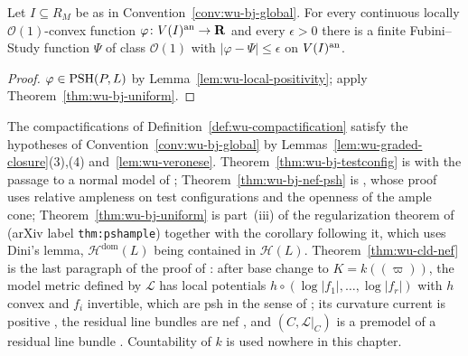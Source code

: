 \begin{theorem}\label{thm:wu-pos}
\leanok
{}
Let $I\subseteq R_M$ be as in Convention~\ref{conv:wu-bj-global}. For every continuous locally $\mathcal O(1)$-convex
function $\varphi\colon V(I)^{\mathrm{an}}\to\mathbf{R}$ and every $\epsilon>0$ there is a finite Fubini--Study function $\Psi$ of class
$\mathcal O(1)$ with $|\varphi-\Psi|\le\epsilon$ on $V(I)^{\mathrm{an}}$.
\end{theorem}

\begin{proof}
$\varphi\in\operatorname{PSH}(P,L)$ by Lemma~\ref{lem:wu-local-positivity}; apply Theorem~\ref{thm:wu-bj-uniform}.
\end{proof}

\begin{remark}\label{rmk:wu-positivity}
The compactifications of Definition~\ref{def:wu-compactification} satisfy the hypotheses of
Convention~\ref{conv:wu-bj-global} by Lemmas~\ref{lem:wu-graded-closure}(3),(4) and~\ref{lem:wu-veronese}.
Theorem~\ref{thm:wu-bj-testconfig} is \cite[Theorem~2.31]{BJ22} with the passage to a normal model of \cite[\S2.3]{FHX};
Theorem~\ref{thm:wu-bj-nef-psh} is \cite[Definition~3.2 and Lemma~4.3]{BJ22}, whose proof uses relative ampleness on test
configurations and the openness of the ample cone; Theorem~\ref{thm:wu-bj-uniform} is part~(iii) of the regularization
theorem of \cite[\S4]{BJ22} (arXiv label \texttt{thm:pshample}) together with the corollary following it, which uses
Dini's lemma, $\mathcal H^{\mathrm{dom}}(L)$ being contained in $\mathcal H(L)$.
Theorem~\ref{thm:wu-cld-nef} is the last paragraph of the proof of \cite[Lemma~5.5]{FHX}: after base change to
$K=k((\varpi))$, the model metric defined by $\mathcal L$ has local potentials $h\circ(\log|f_1|,\dots,\log|f_r|)$ with
$h$ convex and $f_i$ invertible, which are psh in the sense of \cite[Corollaire~18.8.9]{CLD12}; its curvature current
is positive \cite[Proposition~8.3.1]{CLD12}, the residual line bundles are nef
\cite[Th\'eor\`eme~18.8.4, Corollaire~18.8.8]{CLD12}, and $(C,\mathcal L|_C)$ is a premodel of a residual line bundle
\cite[\S17.7.9, Lemme~17.7.10]{CLD12}. Countability of $k$ is used nowhere in this chapter.
\end{remark}
